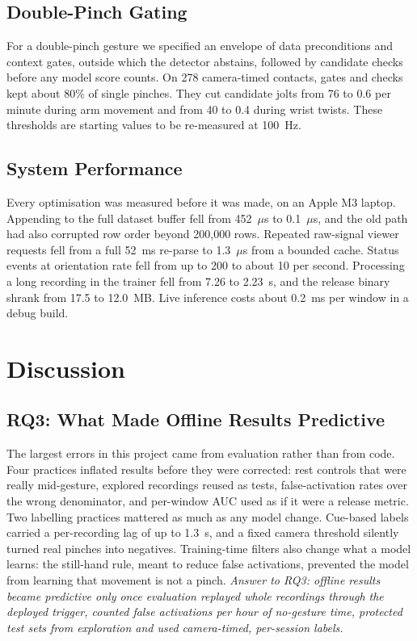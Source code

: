 \subsection{Double-Pinch Gating}

For a double-pinch gesture we specified an envelope of data preconditions and context gates, outside which the detector abstains, followed by candidate checks before any model score counts. On 278 camera-timed contacts, gates and checks kept about 80\% of single pinches. They cut candidate jolts from 76 to 0.6 per minute during arm movement and from 40 to 0.4 during wrist twists. These thresholds are starting values to be re-measured at 100~Hz.

\subsection{System Performance}

Every optimisation was measured before it was made, on an Apple M3 laptop. Appending to the full dataset buffer fell from 452~$\mu$s to 0.1~$\mu$s, and the old path had also corrupted row order beyond 200{,}000 rows. Repeated raw-signal viewer requests fell from a full 52~ms re-parse to 1.3~$\mu$s from a bounded cache. Status events at orientation rate fell from up to 200 to about 10 per second. Processing a long recording in the trainer fell from 7.26 to 2.23~s, and the release binary shrank from 17.5 to 12.0~MB. Live inference costs about 0.2~ms per window in a debug build.

\section{Discussion}\label{sec:discussion}

\subsection{RQ3: What Made Offline Results Predictive}

The largest errors in this project came from evaluation rather than from code. Four practices inflated results before they were corrected: rest controls that were really mid-gesture, explored recordings reused as tests, false-activation rates over the wrong denominator, and per-window AUC used as if it were a release metric. Two labelling practices mattered as much as any model change. Cue-based labels carried a per-recording lag of up to 1.3~s, and a fixed camera threshold silently turned real pinches into negatives. Training-time filters also change what a model learns: the still-hand rule, meant to reduce false activations, prevented the model from learning that movement is not a pinch. \emph{Answer to RQ3: offline results became predictive only once evaluation replayed whole recordings through the deployed trigger, counted false activations per hour of no-gesture time, protected test sets from exploration and used camera-timed, per-session labels.}

